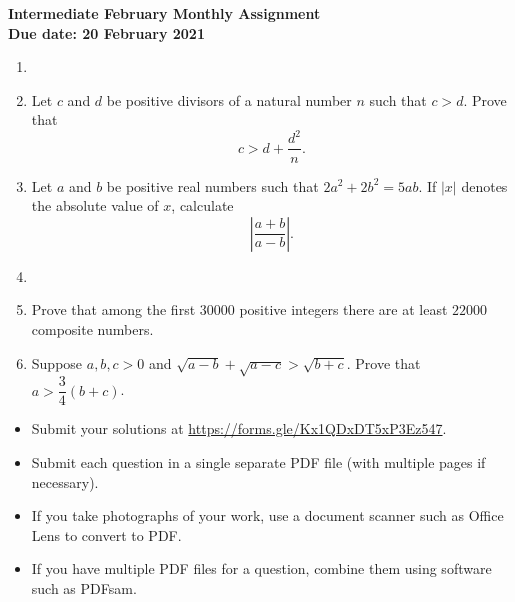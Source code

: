 \documentclass{article}
\begin{document}
\thispagestyle{empty}

\begin{center}
  \textbf{\Large Intermediate February Monthly Assignment}
  \\ \vspace{1em}
  \textbf{\large Due date: 20 February 2021}
\end{center}

\vspace{12pt}

\begin{enumerate}[1.]

\item %


\item %
Let $c$ and $d$ be positive divisors of a natural number $n$ such that $c > d$. Prove that $$c > d + \frac{d^2}{n}.$$


\item %
Let $a$ and $b$ be positive real numbers such that $2a^2 +2b^2 = 5ab$.
If $|x|$ denotes the absolute value of $x$, calculate
\[ \left|\frac{a+b}{a-b}\right|. \]


\item %


\item %
Prove that among the first $30000$ positive integers there are at least $22000$ composite numbers.


\item %
Suppose $a,b,c > 0$ and $\sqrt{a-b} +\sqrt{a-c} > \sqrt{b+c}$. Prove that $a > \dfrac{3}{4} (b+c)$.


\end{enumerate}


\vfill
\begin{itemize}
	\item Submit your solutions at \url{https://forms.gle/Kx1QDxDT5xP3Ez547}.
	\item Submit each question in a single separate PDF file (with multiple pages if necessary).
	\item If you take photographs of your work, use a document scanner such as Office Lens to convert to PDF.
	\item If you have multiple PDF files for a question, combine them using software such as PDFsam.
\end{itemize}
\end{document}
